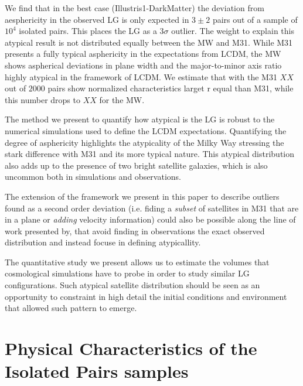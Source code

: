 \documentclass[a4paper,fleqn,usenatbib]{mnras}
\begin{document}
We find that in the best case (Illustris1-DarkMatter) the deviation from aesphericity in the observed LG is only
expected in $3\pm2$ pairs out of a sample of $10^4$ isolated pairs. 
This places the LG as a $3\sigma$ outlier. 
The weight to explain this atypical result is not distributed equally
between the MW and M31. While M31 presents a fully typical asphericity
in the expectations from LCDM, the MW shows aspherical deviations in
plane width and the major-to-minor axis ratio highly atypical in the
framework of LCDM. 
We estimate that with the M31 $XX$ out of $2000$ pairs show normalized
characteristics larget r equal than M31, while this number drops to 
$XX$ for the MW.

The method we present to quantify how atypical is the LG is robust to
the numerical simulations used to define the LCDM expectations. 
Quantifying the degree of asphericity highlights the atypicality of
the Milky Way stressing the stark difference with M31 and its more
typical nature. 
This atypical distribution also adds up to the presence of two bright
satellite galaxies, which is also uncommon both in simulations and
observations. 

The extension of the framework we present in this paper to describe
outliers found as a second order deviation (i.e. fiding a \emph{subset} of
satellites in M31 that are in a plane or \emph{adding} velocity
information) could also be possible along the line of work presented
by, that avoid finding in observations the exact observed distribution
and instead focuse in defining atypicallity. 


The quantitative study we present allows us to estimate  the volumes 
that cosmological simulations have to probe in order to study similar
LG configurations.
Such atypical satellite distribution should be seen as an opportunity
to constraint in high detail the initial conditions and environment
that allowed such pattern to emerge. 









\newpage

\appendix

\section{Physical Characteristics of the Isolated Pairs samples}
\end{document}
